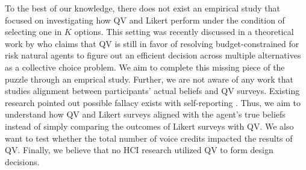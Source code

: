 To the best of our knowledge,
there does not exist an empirical study 
that focused on investigating
how QV and Likert perform
under the condition of selecting
one in $K$ options.
This setting was recently discussed 
in a theoretical work by \textcite{eguia2019quadratic}
who claims that QV is still in favor 
of resolving budget-constrained 
for risk natural agents
to figure out an efficient decision 
across multiple alternatives
as a collective choice problem.
We aim to complete this missing piece of the puzzle 
through an emprical study.
Further,
we are not aware of any work
that studies alignment between
participants' actual beliefs
and QV surveys.
Existing research pointed out 
possible fallacy exists with self-reporting
\cite{araujo2017much, vavreck2007exaggerated}.
Thus, we aim to understand
how QV and Likert surveys
aligned with the agent's true beliefs
instead of simply comparing 
the outcomes of Likert surveys with QV.
We also want to test
whether the total number of voice credits 
impacted the results of QV.
Finally, we believe that
no HCI research utilized QV
to form design decisions.